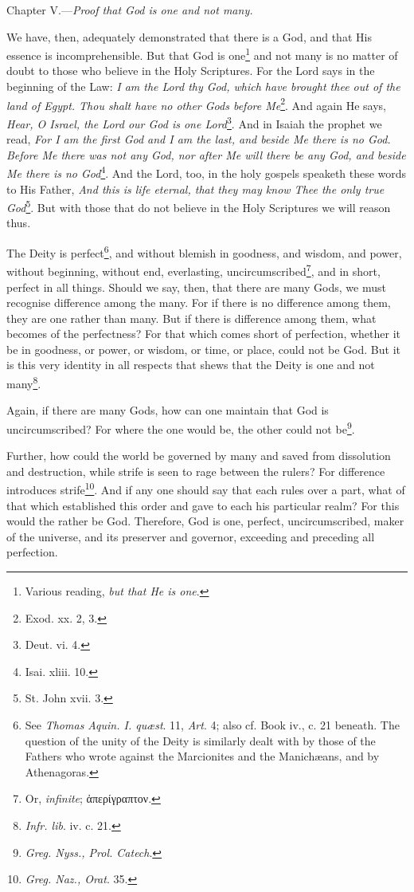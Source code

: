 Chapter V.—\emph{Proof that God is one and not many.}

We have, then, adequately demonstrated that there is a God, and that His essence is incomprehensible. But that God is one\footnote{Various reading, \emph{but that He is one}.} and not many is no matter of doubt to those who believe in the Holy Scriptures. For the Lord says in the beginning of the Law: \emph{I am the Lord thy God, which have brought thee out of the land of Egypt. Thou shalt have no other Gods before Me}\footnote{Exod. xx. 2, 3.}. And again He says, \emph{Hear, O Israel, the Lord our God is one Lord}\footnote{Deut. vi. 4.}. And in Isaiah the prophet we read, \emph{For I am the first God and I am the last, and beside Me there is no God. Before Me there was not any God, nor after Me will there be any God, and beside Me there is no God}\footnote{Isai. xliii. 10.}. And the Lord, too, in the holy gospels speaketh these words to His Father, \emph{And this is life eternal, that they may know Thee the only true God}\footnote{St. John xvii. 3.}. But with those that do not believe in the Holy Scriptures we will reason thus.

The Deity is perfect\footnote{See \emph{Thomas Aquin. I. quæst}. 11, \emph{Art}. 4; also cf. Book iv., c. 21 beneath. The question of the unity of the Deity is similarly dealt with by those of the Fathers who wrote against the Marcionites and the Manichæans, and by Athenagoras.}, and without blemish in goodness, and wisdom, and power, without beginning, without end, everlasting, uncircumscribed\footnote{Or, \emph{infinite}; \textgreek{ἀπερίγραπτον}.}, and in short, perfect in all things. Should we say, then, that there are many Gods, we must recognise difference among the many. For if there is no difference among them, they are one rather than many. But if there is difference among them, what becomes of the perfectness? For that which comes short of perfection, whether it be in goodness, or power, or wisdom, or time, or place, could not be God. But it is this very identity in all respects that shews that the Deity is one and not many\footnote{\emph{Infr. lib}. iv. c. 21.}.

Again, if there are many Gods, how can one maintain that God is uncircumscribed? For where the one would be, the other could not be\footnote{\emph{Greg. Nyss., Prol. Catech}.}.

Further, how could the world be governed by many and saved from dissolution and destruction, while strife is seen to rage between the rulers? For difference introduces strife\footnote{\emph{Greg. Naz., Orat}. 35.}. And if any one should say that each rules over a part, what of that which established this order and gave to each his particular realm? For this would the rather be God. Therefore, God is one, perfect, uncircumscribed, maker of the universe, and its preserver and governor, exceeding and preceding all perfection.

